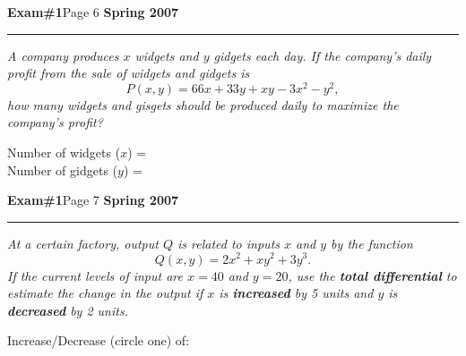 \documentclass[12pt]{article}
\begin{document}
\hfill{\large\bf Exam\#1}\hfill Page 6\hfill{\large\bf
  Spring 2007}\hrule

\bigskip
{\problem[16 pts] \em A company produces $x$ widgets and $y$ gidgets
  each day.  If the company's daily profit from the sale of widgets
  and gidgets is 
  $$ P(x,y) = 66x + 33y + xy -3x^2 - y^2,$$
  how many widgets and gisgets should be produced daily to maximize
  the company's profit?}
\vspace{17cm}
  \begin{flushright}
    Number of widgets ($x$) =
    \framebox[6cm]{\raisebox{1cm}[0.6cm][0.4cm]} \\
    Number of gidgets ($y$) =
    \framebox[6cm]{\raisebox{1cm}[0.6cm][0.4cm]}
  \end{flushright}
\newpage

\hfill{\large\bf Exam\#1}\hfill Page 7\hfill{\large\bf
  Spring 2007}\hrule

\bigskip
{\problem[16 pts] \em At a certain factory, output $Q$ is related to
  inputs $x$ and $y$ by the function
  $$ Q(x,y) = 2x^2 + xy^2 + 3y^3.$$
  If the current levels of input are $x=40$ and $y=20$, use the {\bf
  total differential} to estimate the change in the output if $x$ is
  {\bf increased} by 5 units and $y$ is {\bf decreased} by 2 units.}
\vspace{18cm}
\begin{flushright}
  Increase/Decrease (circle one) of:
  \framebox[6cm]{\raisebox{1cm}[0.6cm][0.4cm]}
\end{flushright}
\end{document}
